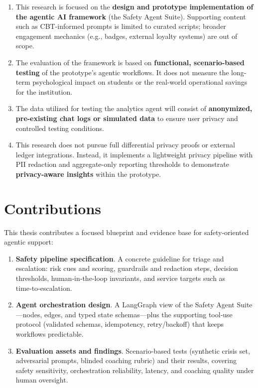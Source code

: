 \begin{enumerate}
    \item This research is focused on the \textbf{design and prototype implementation of the agentic AI framework} (the Safety Agent Suite). Supporting content such as CBT-informed prompts is limited to curated scripts; broader engagement mechanics (e.g., badges, external loyalty systems) are out of scope.

    \item The evaluation of the framework is based on \textbf{functional, scenario-based testing} of the prototype's agentic workflows. It does not measure the long-term psychological impact on students or the real-world operational savings for the institution.

    \item The data utilized for testing the analytics agent will consist of \textbf{anonymized, pre-existing chat logs or simulated data} to ensure user privacy and controlled testing conditions.

    \item This research does not pursue full differential privacy proofs or external ledger integrations. Instead, it implements a lightweight privacy pipeline with PII redaction and aggregate-only reporting thresholds to demonstrate \textbf{privacy-aware insights} within the prototype.
\end{enumerate}

\section{Contributions}
\label{sec:contributions}

This thesis contributes a focused blueprint and evidence base for safety‑oriented agentic support:

\begin{enumerate}
    \item \textbf{Safety pipeline specification}. A concrete guideline for triage and escalation: risk cues and scoring, guardrails and redaction steps, decision thresholds, human‑in‑the‑loop invariants, and service targets such as time‑to‑escalation.
    \item \textbf{Agent orchestration design}. A LangGraph view of the Safety Agent Suite—nodes, edges, and typed state schemas—plus the supporting tool‑use protocol (validated schemas, idempotency, retry/backoff) that keeps workflows predictable.
    \item \textbf{Evaluation assets and findings}. Scenario-based tests (synthetic crisis set, adversarial prompts, blinded coaching rubric) and their results, covering safety sensitivity, orchestration reliability, latency, and coaching quality under human oversight.
\end{enumerate}

